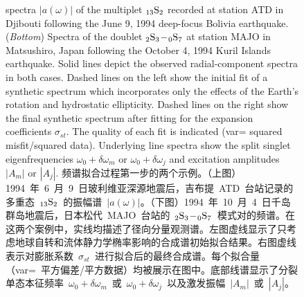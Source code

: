 \begin{figure}[!t]
{spectra $|a(\omega)|$ of the multiplet ${}_{13}{\rm S}_2$
recorded at station ATD in Djibouti following the
June 9, 1994 deep-focus Bolivia earthquake.
({\em Bottom\/}) Spectra of the
doublet ${}_2{\rm S}_3\!-\!{}_0{\rm S}_7$ at
station MAJO in Matsushiro, Japan following
the October 4, 1994 Kuril Islands earthquake.
Solid lines depict the observed radial-component
spectra in both cases.  Dashed lines on the left
show the initial fit of a synthetic spectrum 
which incorporates only the effects of the Earth's
rotation and hydrostatic ellipticity.  Dashed lines
on the right show the final synthetic spectrum
after fitting for the
expansion coefficients $\sigma_{st}$.  The quality of each fit is
indicated (var\hspace{0.6 mm}=\hspace{0.6 mm}
squared misfit/squared data).
Underlying line spectra show the split singlet eigenfrequencies
$\omega_0+\delta\omega_m$ or $\omega_0+\delta\omega_j$
and excitation amplitudes $|A_m|$ or $|A_j|$.
\fi
频谱拟合过程第一步的两个示例。（上图）1994~年~6~月~9~日玻利维亚深源地震后，吉布提~ATD~台站记录的多重态~${}_{13}{\rm S}_2$~的振幅谱~$|a(\omega)|$。（下图）1994~年~10~月~4~日千岛群岛地震后，日本松代~MAJO~台站的~${}_2{\rm S}_3\!-\!{}_0{\rm S}_7$~模式对的频谱。在这两个案例中，实线均描述了径向分量观测谱。左图虚线显示了只考虑地球自转和流体静力学椭率影响的合成谱初始拟合结果。右图虚线表示对膨胀系数~$\sigma_{st}$~进行拟合后的最终合成谱。每个拟合量（var\hspace{0.6 mm}=\hspace{0.6 mm}~平方偏差/平方数据）均被展示在图中。底部线谱显示了分裂单态本征频率~$\omega_0+\delta\omega_m$~或~$\omega_0+\delta\omega_j$~以及激发振幅~$|A_m|$~或~$|A_j|$。
}
\end{figure}
